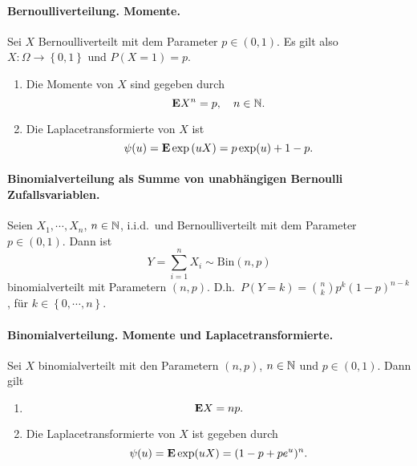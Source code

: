 \paragraph{Bernoulliverteilung. Momente. }
Sei $X$ Bernoulliverteilt mit dem Parameter $p \in \left( 0,1 \right)$. Es gilt also
$X: \Omega \to \left\{ 0,1 \right\}$ und $P(X=1)=p$. 
\begin{enumerate}
    \item Die Momente von $X$ sind gegeben durch
        \begin{equation*}
            \mathbf{E} X^n = p, \quad n\in\mathbb N.
        \end{equation*}
    \item Die Laplacetransformierte von $X$ ist 
        \begin{equation*}
            \psi(u) = \mathbf{E} \exp \left( u X \right) = p\exp (u)+1-p.
        \end{equation*} 
\end{enumerate}

\paragraph{Binomialverteilung als Summe von unabhängigen Bernoulli Zufallsvariablen.}
Seien $X_1, \cdots, X_n$, $n\in\mathbb N$, i.i.d.\ und Bernoulliverteilt mit dem Parameter $p\in (0,1)$. 
Dann ist
\begin{equation*}
    Y=\sum_{i=1}^{n} X_i \sim \text{Bin}(n,p)
\end{equation*}
binomialverteilt mit Parametern $(n,p)$. D.h.\ $P(Y = k) = \binom{n}{k}  p^{k}(1-p)^{n-k}$, 
für $k\in \left\{ 0, \cdots, n \right\}$.

\paragraph{Binomialverteilung. Momente und Laplacetransformierte.}
Sei $X$ binomialverteilt mit den Parametern $(n,p)$, $n\in\mathbb N$ und $p\in(0,1)$. Dann gilt
\begin{enumerate}
    \item \begin{equation*}
            \mathbf{E} X = np. 
        \end{equation*}
    \item Die Laplacetransformierte von $X$ ist gegeben durch
        \begin{equation*}
            \psi(u) = \mathbf{E} \exp( uX) = (1 -p + p e^u)^{n}.
        \end{equation*}
\end{enumerate}

